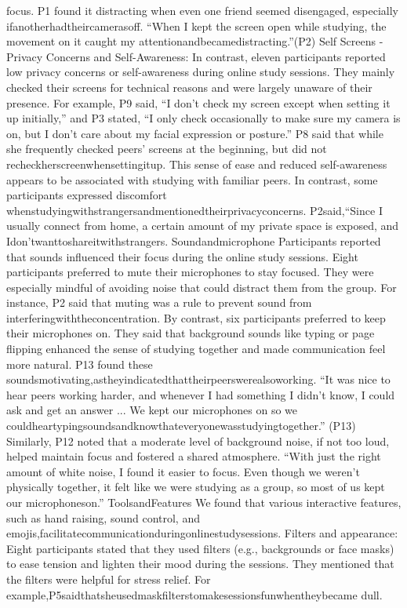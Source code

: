 \documentclass[12pt]{ctexart}
\begin{document}
focus. P1 found it distracting when even one friend seemed disengaged, especially
ifanotherhadtheircamerasoff.
“When I kept the screen open while studying, the movement on it caught my
attentionandbecamedistracting.”(P2)
Self Screens - Privacy Concerns and Self-Awareness: In contrast, eleven
participants reported low privacy concerns or self-awareness during online study
sessions. They mainly checked their screens for technical reasons and were largely
unaware of their presence. For example, P9 said, “I don’t check my screen except
when setting it up initially,” and P3 stated, “I only check occasionally to make sure
my camera is on, but I don’t care about my facial expression or posture.” P8 said
that while she frequently checked peers’ screens at the beginning, but did not
recheckherscreenwhensettingitup.
This sense of ease and reduced self-awareness appears to be associated with
studying with familiar peers. In contrast, some participants expressed discomfort
whenstudyingwithstrangersandmentionedtheirprivacyconcerns. P2said,“Since
I usually connect from home, a certain amount of my private space is exposed, and
Idon’twanttoshareitwithstrangers.
Soundandmicrophone
Participants reported that sounds influenced their focus during the online study
sessions. Eight participants preferred to mute their microphones to stay focused.
They were especially mindful of avoiding noise that could distract them from the
group. For instance, P2 said that muting was a rule to prevent sound from
interferingwiththeconcentration.
By contrast, six participants preferred to keep their microphones on. They said
that background sounds like typing or page flipping enhanced the sense of
studying together and made communication feel more natural. P13 found these
soundsmotivating,astheyindicatedthattheirpeerswerealsoworking.
“It was nice to hear peers working harder, and whenever I had something I
didn’t know, I could ask and get an answer ... We kept our microphones on so we
couldheartypingsoundsandknowthateveryonewasstudyingtogether.” (P13)
Similarly, P12 noted that a moderate level of background noise, if not too loud,
helped maintain focus and fostered a shared atmosphere. “With just the right
amount of white noise, I found it easier to focus. Even though we weren’t
physically together, it felt like we were studying as a group, so most of us kept our
microphoneson.”
ToolsandFeatures
We found that various interactive features, such as hand raising, sound control, and
emojis,facilitatecommunicationduringonlinestudysessions.
Filters and appearance: Eight participants stated that they used filters (e.g.,
backgrounds or face masks) to ease tension and lighten their mood during the
sessions. They mentioned that the filters were helpful for stress relief. For
example,P5saidthatsheusedmaskfilterstomakesessionsfunwhentheybecame
dull.
\end{document}
